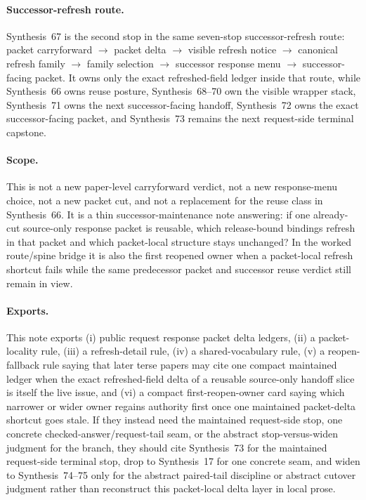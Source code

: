 \documentclass[11pt]{article}
\begin{document}
\paragraph{Successor-refresh route.}
Synthesis~67 is the second stop in the same seven-stop successor-refresh route: packet carryforward $\rightarrow$ packet delta $\rightarrow$ visible refresh notice $\rightarrow$ canonical refresh family $\rightarrow$ family selection $\rightarrow$ successor response menu $\rightarrow$ successor-facing packet.
It owns only the exact refreshed-field ledger inside that route, while Synthesis~66 owns reuse posture, Synthesis~68--70 own the visible wrapper stack, Synthesis~71 owns the next successor-facing handoff, Synthesis~72 owns the exact successor-facing packet, and Synthesis~73 remains the next request-side terminal capstone.

\paragraph{Scope.}
This is not a new paper-level carryforward verdict, not a new response-menu choice, not a new packet cut, and not a replacement for the reuse class in Synthesis~66.
It is a thin successor-maintenance note answering: if one already-cut source-only response packet is reusable, which release-bound bindings refresh in that packet and which packet-local structure stays unchanged? In the worked route/spine bridge it is also the first reopened owner when a packet-local refresh shortcut fails while the same predecessor packet and successor reuse verdict still remain in view.

\paragraph{Exports.}
This note exports (i) public request response packet delta ledgers, (ii) a packet-locality rule, (iii) a refresh-detail rule, (iv) a shared-vocabulary rule, (v) a reopen-fallback rule saying that later terse papers may cite one compact maintained ledger when the exact refreshed-field delta of a reusable source-only handoff slice is itself the live issue, and (vi) a compact first-reopen-owner card saying which narrower or wider owner regains authority first once one maintained packet-delta shortcut goes stale. If they instead need the maintained request-side stop, one concrete checked-answer/request-tail seam, or the abstract stop-versus-widen judgment for the branch, they should cite Synthesis~73 for the maintained request-side terminal stop, drop to Synthesis~17 for one concrete seam, and widen to Synthesis~74--75 only for the abstract paired-tail discipline or abstract cutover judgment rather than reconstruct this packet-local delta layer in local prose.
\end{document}
